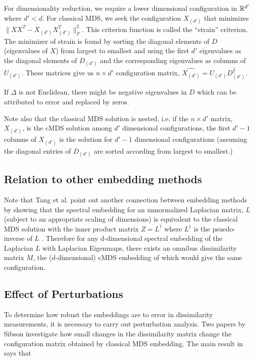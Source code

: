 \documentclass[12pt,oneside,final]{thesis}\usepackage[]{graphicx}\usepackage[]{color}
\begin{document}
For dimensionality reduction, we require a lower dimensional configuration in $\mathbb{R}^{d'}$where $d'<d$. For classical MDS, we seek  the configuration $X_{(d')}$ that minimizes   $\|XX^T-X_{(d')}X_{(d')}^T\|_F^2$. This criterion function is called the ``strain'' criterion. The minimizer of strain is found by sorting the diagonal elements of $D$ (eigenvalues of $X$) from largest to smallest and  using the first $d'$ eigenvalues as the diagonal elements of  $D_{(d')}$ and the corresponding eigenvalues as columns of $U_{(d')}$. These matrices give us $n \times d'$ configuration matrix, $\hat{X_{(d')}}=U_{(d')}D_{(d')}^{\frac{1}{2}}$. 

If $\Delta$ is not Euclidean, there might be negative eigenvalues in $D$ which can be attributed to error and replaced by zeros.

Note also that the classical MDS solution  is nested, i.e. if the $n \times d'$ matrix, $X_{(d')}$,  is the cMDS solution among $d'$ dimensional configurations, the first $d'-1$ columns of $X_{(d')}$ is the solution for $d'-1$ dimensional configurations (assuming the diagonal entries of  $D_{(d')}$ are sorted according from largest to smallest.)


\subsection{Relation to other embedding methods\label{MDS_SpectralEmbed}}

Note that Tang et al.\cite{MinhTrosset_SpectralEmbed} point out another connection between embedding methods by showing that the spectral embedding for  an unnormalized Laplacian matrix, $L$ (subject to  an appropriate scaling of dimensions) is equivalent to the classical MDS solution with the inner product matrix $Z=L^{\dag}$ where $L^{\dag}$ is the psuedo-inverse of $L$ \cite{MinhTrosset_SpectralEmbed}. Therefore for any d-dimensional spectral embedding of the Laplacian $L$  with Laplacian Eigenmaps, there exists an omnibus dissimilarity matrix $M$, the ($d$-dimensional) cMDS embedding of which   would give the same configuration.


\subsection{Effect of Perturbations}
  To determine how robust the embeddings are to error in dissimilarity measurements, it is necessary to carry out perturbation analysis. Two papers by Sibson \cite{Sibson_perturbational1979} investigate how small changes in the dissimilarity matrix change the configuration matrix obtained by classical MDS embedding. The main result in  \cite{Sibson_perturbational1979} says that 
  
\end{document}
